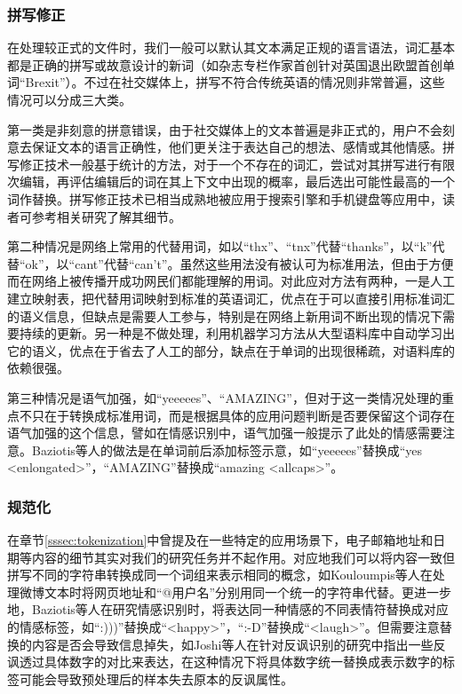 \subsubsection{拼写修正}

在处理较正式的文件时，我们一般可以默认其文本满足正规的语言语法，词汇基本都是正确的拼写或故意设计的新词（如杂志专栏作家首创针对英国退出欧盟首创单词“Brexit”）。不过在社交媒体上，拼写不符合传统英语的情况则非常普遍，这些情况可以分成三大类。

第一类是非刻意的拼意错误，由于社交媒体上的文本普遍是非正式的，用户不会刻意去保证文本的语言正确性，他们更关注于表达自己的想法、感情或其他情感。拼写修正技术一般基于统计的方法，对于一个不存在的词汇，尝试对其拼写进行有限次编辑，再评估编辑后的词在其上下文中出现的概率，最后选出可能性最高的一个词作替换。拼写修正技术已相当成熟地被应用于搜索引擎和手机键盘等应用中，读者可参考相关研究\cite{ahmed2009revised}\cite{nejja2015context}了解其细节。

第二种情况是网络上常用的代替用词，如以“thx”、“tnx”代替“thanks”，以“k”代替“ok”，以“cant”代替“can't”。虽然这些用法没有被认可为标准用法，但由于方便而在网络上被传播开成功网民们都能理解的用词。对此应对方法有两种，一是人工建立映射表，把代替用词映射到标准的英语词汇，优点在于可以直接引用标准词汇的语义信息，但缺点是需要人工参与，特别是在网络上新用词不断出现的情况下需要持续的更新。另一种是不做处理，利用机器学习方法从大型语料库中自动学习出它的语义，优点在于省去了人工的部分，缺点在于单词的出现很稀疏，对语料库的依赖很强。

第三种情况是语气加强，如“yeeeees”、“AMAZING”，但对于这一类情况处理的重点不只在于转换成标准用词，而是根据具体的应用问题判断是否要保留这个词存在语气加强的这个信息，譬如在情感识别中，语气加强一般提示了此处的情感需要注意。Baziotis等人\cite{baziotis2017semeval2}的做法是在单词前后添加标签示意，如“yeeeees”替换成“yes <enlongated>”，“AMAZING”替换成“amazing <allcaps>”。

\subsubsection{规范化}

在章节\ref{sssec:tokenization}中曾提及在一些特定的应用场景下，电子邮箱地址和日期等内容的细节其实对我们的研究任务并不起作用。对应地我们可以将内容一致但拼写不同的字符串转换成同一个词组来表示相同的概念，如Kouloumpis等人\cite{kouloumpis2011twitter}在处理微博文本时将网页地址和“@用户名”分别用同一个统一的字符串代替。更进一步地，Baziotis等人\cite{baziotis2017semeval2}在研究情感识别时，将表达同一种情感的不同表情符替换成对应的情感标签，如“:)))”替换成“<happy>”，“:-D”替换成“<laugh>”。但需要注意替换的内容是否会导致信息掉失，如Joshi等人\cite{joshi2015harnessing}在针对反讽识别的研究中指出一些反讽透过具体数字的对比来表达，在这种情况下将具体数字统一替换成表示数字的标签可能会导致预处理后的样本失去原本的反讽属性。

